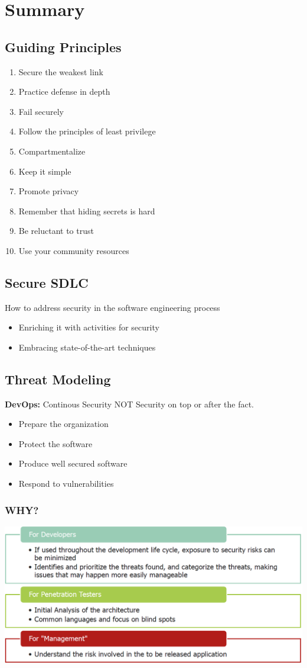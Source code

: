 
\section{Summary}
\subsection{Guiding Principles}
\begin{enumerate}
    \item Secure the weakest link
    \item Practice defense in depth
    \item Fail securely
    \item Follow the principles of least privilege
    \item Compartmentalize
    \item Keep it simple
    \item Promote privacy
    \item Remember that hiding secrets is hard
    \item Be reluctant to trust
    \item Use your community resources
\end{enumerate}

\subsection{Secure SDLC}
How to address security in the software engineering process
\begin{itemize}
    \item Enriching it with activities for security
    \item Embracing state-of-the-art techniques
\end{itemize}

\subsection{Threat Modeling}
\textbf{DevOps:} Continous Security NOT Security on top or after the fact.\\
\begin{itemize}
    \item Prepare the organization
    \item Protect the software
    \item Produce well secured software
    \item Respond to vulnerabilities
\end{itemize}
\subsubsection{WHY?}
\includegraphics[width=\linewidth]{../img/threat_modeling.png}


